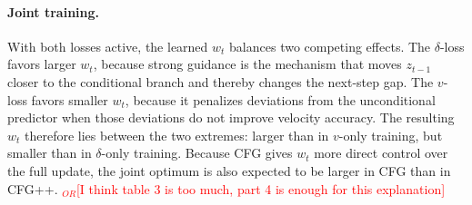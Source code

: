 \documentclass[acmtog]{acmart}
\newcommand{\orz}[1]{\textcolor{red}{$_{OR}$[#1]}}
\begin{document}
\paragraph{Joint training.}
With both losses active, the learned \(w_t\) balances two competing effects.
The \(\delta\)-loss favors larger \(w_t\), because strong guidance is the mechanism that moves \(z_{t-1}\) closer to the conditional branch and thereby changes the next-step gap.
The \(v\)-loss favors smaller \(w_t\), because it penalizes deviations from the unconditional predictor when those deviations do not improve velocity accuracy.
The resulting \(w_t\) therefore lies between the two extremes:
larger than in \(v\)-only training, but smaller than in \(\delta\)-only training.
Because CFG gives \(w_t\) more direct control over the full update, the joint optimum is also expected to be larger in CFG than in CFG++.
\orz{I think table 3 is too much, part 4 is enough for this explanation}
\end{document}
